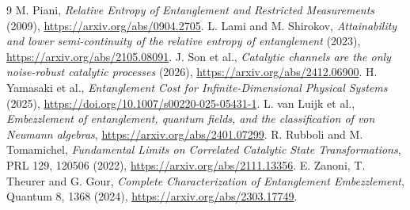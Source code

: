 \documentclass[11pt,a4paper]{article}
\begin{document}
\begingroup\small
\begin{thebibliography}{9}
\setlength{\itemsep}{1pt}
 M. Piani, \emph{Relative Entropy of Entanglement and Restricted
Measurements} (2009), \url{https://arxiv.org/abs/0904.2705}.
 L. Lami and M. Shirokov, \emph{Attainability and lower
semi-continuity of the relative entropy of entanglement} (2023),
\url{https://arxiv.org/abs/2105.08091}.
 J. Son et al., \emph{Catalytic channels are the only noise-robust
catalytic processes} (2026), \url{https://arxiv.org/abs/2412.06900}.
 H. Yamasaki et al., \emph{Entanglement Cost for
Infinite-Dimensional Physical Systems} (2025),
\url{https://doi.org/10.1007/s00220-025-05431-1}.
 L. van Luijk et al., \emph{Embezzlement of entanglement,
quantum fields, and the classification of von Neumann algebras},
\url{https://arxiv.org/abs/2401.07299}.
 R. Rubboli and M. Tomamichel, \emph{Fundamental Limits on
Correlated Catalytic State Transformations}, PRL 129, 120506 (2022),
\url{https://arxiv.org/abs/2111.13356}.
 E. Zanoni, T. Theurer and G. Gour, \emph{Complete
Characterization of Entanglement Embezzlement}, Quantum 8, 1368 (2024),
\url{https://arxiv.org/abs/2303.17749}.
\end{thebibliography}
\endgroup
\end{document}
